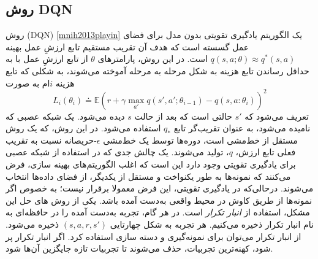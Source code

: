 \subsection{روش DQN}
روش 
\textit{}
(DQN)
\ref{mnih2013playin}
 یک الگوریتم یادگیری تقویتی بدون مدل برای فضای عمل گسسته است که هدف آن تقریب مستقیم تابع ارزشِ عمل بهینه 
 $q(s,a; \theta) \approx  q^*(s,a)$
 است. در این روش، پارامترهای $\theta$ از تابع ارزشِ عمل با به حداقل رساندن تابع هزینه به شکل مرحله به مرحله آموخته می‌شوند، به شکلی که تابع هزینه $i$ام به صورت
 $$L_i(\theta_i) \doteq \mathbb{E} {\left( r+\gamma \max_{a'} q(s',a'; \theta_{i-1})- q(s,a:\theta_i) \right)}^2$$
 تعریف می‌شود که 
$s'$
 حالتی است که بعد از حالت $s$ دیده می‌شود. یک شبکه عصبی که 
\textit{}
  نامیده می‌شود، به عنوان تقریب‌گر تابع
   $q_*$
    استفاده می‌شود.
در این روش، که یک روش مستقل از خط‌مشی است، دوره‌ها توسط یک خط‌مشی 
$\epsilon$-حریصانه
نسبت به تقریب فعلی تابع ارزش، $q$، تولید می‌شوند. 
یک چالش جدی که در استفاده از شبکه عصبی برای یادگیری تقویتی وجود دارد این است که اغلب الگوریتم‌های بهینه‌ سازی، فرض می‌کنند که نمونه‌ها به طور یکنواخت و مستقل از یکدیگر، از فضای داده‌ها انتخاب می‌شوند. درحالی‌که در یادگیری تقویتی، این فرض معمولا برقرار نیست؛ به خصوص اگر نمونه‌ها از طریق کاوش در محیط واقعی به‌دست آمده باشد. یکی از روش های  حل این مشکل، استفاده از 
\textit{انبار تکرار}
است. در هر گام، تجربه به‌دست آمده را در حافظه‌ای به نام انبار تکرار ذخیره می‌کنیم. هر تجربه به شکل چهارتایی 
$(s,a,r,s')$
ذخیره می‌شود. از انبار تکرار می‌توان برای نمونه‌گیری و دسته  سازی استفاده کرد. اگر انبار تکرار پر شود، کهنه‌ترین تجربیات، حذف می‌شوند تا تجربیات تازه جایگزین آن‌ها شود.


